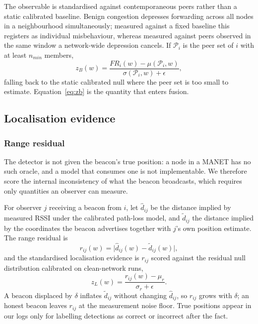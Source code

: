 The observable is standardised against contemporaneous peers rather than a
static calibrated baseline. Benign congestion depresses forwarding across all
nodes in a neighbourhood simultaneously; measured against a fixed baseline
this registers as individual misbehaviour, whereas measured against peers
observed in the same window a network-wide depression cancels. If
$\mathcal{P}_i$ is the peer set of $i$ with at least $n_{min}$ members,
\begin{equation}
\label{eq:zb}
z_B(w) = \frac{FR_i(w) - \mu(\mathcal{P}_i, w)}{\sigma(\mathcal{P}_i, w) + \epsilon},
\end{equation}
falling back to the static calibrated null where the peer set is too small to
estimate. Equation~\eqref{eq:zb} is the quantity that enters fusion.

\subsection{Localisation evidence}

\subsubsection{Range residual}

The detector is not given the beacon's true position: a node in a MANET has no
such oracle, and a model that consumes one is not implementable. We therefore
score the internal inconsistency of what the beacon broadcasts, which requires
only quantities an observer can measure.

For observer $j$ receiving a beacon from $i$, let $\hat d_{ij}$ be the distance
implied by measured RSSI under the calibrated path-loss model, and
$\tilde d_{ij}$ the distance implied by the coordinates the beacon advertises
together with $j$'s own position estimate. The range residual is
\begin{equation}
\label{eq:resid}
r_{ij}(w) = \bigl| \hat d_{ij}(w) - \tilde d_{ij}(w) \bigr|,
\end{equation}
and the standardised localisation evidence is $r_{ij}$ scored against the
residual null distribution calibrated on clean-network runs,
\begin{equation}
\label{eq:zl}
z_L(w) = \frac{r_{ij}(w) - \mu_r}{\sigma_r + \epsilon}.
\end{equation}
A beacon displaced by $\delta$ inflates $\tilde d_{ij}$ without changing
$\hat d_{ij}$, so $r_{ij}$ grows with $\delta$; an honest beacon leaves $r_{ij}$
at the measurement noise floor. True positions appear in our logs only for
labelling detections as correct or incorrect after the fact.

